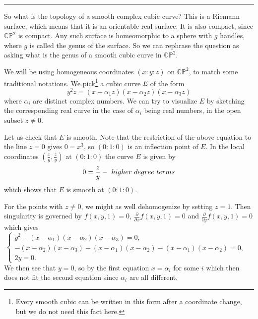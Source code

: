 \documentclass[11pt]{article}
\numberwithin{equation}{section}
\numberwithin{footnote}{section}
\newcommand{\blue}{\color{blue}}
\renewcommand{\P}{{\mathbb P}}
\newcommand{\C}{{\mathbb C}}
\begin{document}
\smallskip
{\blue \hrule}
So what is the topology of a smooth complex cubic curve? This is a  Riemann surface, which means that it is an orientable real surface. It is also compact, since $\C\P^2$ is compact. Any such surface is homeomorphic to a sphere with $g$ handles, where $g$ is called the {\blue genus} of the surface. So we can rephrase the question as asking what is the genus of a smooth cubic curve in $\C\P^2$. 

\smallskip
We will be using homogeneous coordinates $(x:y:z)$ on $\C\P^2$, to match some traditional notations. 
We pick\footnote{ Every smooth cubic can be written in this form after a coordinate change, but we do not need this fact here.} a cubic curve $E$ of the form
\begin{equation}\label{Esp}
y^2 z = (x- \alpha_1 z) (x-\alpha_2z) (x-\alpha_3z)
\end{equation}
where $\alpha_i$ are distinct complex numbers.
We can try to visualize $E$ by sketching the corresponding real curve in the case of $\alpha_i$ being real numbers, in the open subset $z\neq 0$. 


\smallskip
Let us check that $E$ is smooth. Note that the restriction of the above equation to the line $z=0$ gives $0=x^3$, so $(0:1:0)$ is an inflection point of $E$. In the local coordinates $(\frac xy, \frac zy)$ at $(0:1:0)$ the curve $E$ is given by
$$
0 = \frac zy - {\rm ~higher~degree~terms}
$$
which shows that $E$ is smooth at $(0:1:0)$. 

\smallskip
For the points with $z\neq 0$, we might as well dehomogenize by setting $z=1$. Then singularity is governed by $f(x,y,1)=0$, $\frac {\partial }{\partial x} f(x,y,1) = 0$ and $\frac {\partial }{\partial y} f(x,y,1) = 0$ which gives
$$
\left\{
\begin{array}{ll}
y^2-(x-\alpha_1)(x-\alpha_2)(x-\alpha_3) = 0,&\\
-(x-\alpha_2)(x-\alpha_3)-(x-\alpha_1)(x-\alpha_2)-(x-\alpha_1)(x-\alpha_2)=0,&\\
2y=0.&
\end{array}
\right.
$$
We then see that $y=0$, so by the first equation $x=\alpha_i$ for some $i$ which then does not fit the second equation since $\alpha_i$ are all different.
\end{document}
